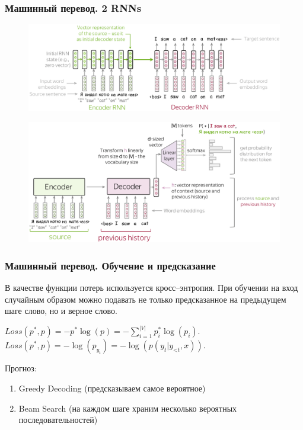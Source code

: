 \documentclass[notheorems, handout]{beamer}
\begin{document}
	\begin{frame}
	\frametitle{Машинный перевод. 2 RNNs}
		\begin{figure}[H]
			\begin{center}
				\includegraphics[scale=0.1]{img/two_rnn.png}
			\end{center}
		\end{figure}

		\begin{figure}[H]
			\begin{center}
				\includegraphics[scale=0.1]{img/two_rnn2.png}
			\end{center}
		\end{figure}
	\end{frame}
	\begin{frame}
	\frametitle{Машинный перевод. Обучение и предсказание}
		В качестве функции потерь используется кросс--энтропия. При обучении на вход случайным образом можно подавать не только предсказанное на предыдущем шаге слово, но и верное слово.
	
		$Loss(p^{\ast}, p^{})= - p^{\ast} \log(p) = -\sum\limits_{i=1}^{|V|}p_i^{\ast} \log(p_i).$
		$Loss(p^{\ast}, p) = -\log(p_{y_t})=-\log(p(y_t| y_{\mbox{<}t}, x)).$
		\vspace{0.3cm}
		
	 	Прогноз:
	 	\begin{enumerate}
	 		\item Greedy Decoding (предсказываем самое вероятное)
	 		\item Beam Search (на каждом шаге храним несколько вероятных последовательностей)
	 	\end{enumerate}
	\end{frame}
		
\end{document}
